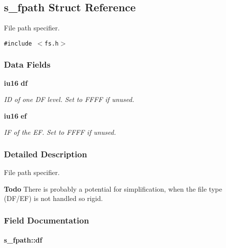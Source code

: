 \subsection{s\_\-fpath Struct Reference}
\label{structs__fpath}
File path specifier.  


{\tt \#include $<$fs.h$>$}

\subsubsection*{Data Fields}
\begin{CompactItemize}
\item 
{\bf iu16} {\bf df}
\begin{CompactList}\small\item\em ID of one DF level. Set to FFFF if unused. \item\end{CompactList}\item 
{\bf iu16} {\bf ef}
\begin{CompactList}\small\item\em IF of the EF. Set to FFFF if unused. \item\end{CompactList}\end{CompactItemize}


\subsubsection{Detailed Description}
File path specifier. 

\begin{Desc}
\item[{\bf Todo}]There is probably a potential for simplification, when the file type (DF/EF) is not handled so rigid. \end{Desc}




\subsubsection{Field Documentation}
\paragraph{ {\bf s\_\-fpath::df}}\hfill\label{structs__fpath_a16acae1b4ba3966c13fe44b278ced64}


